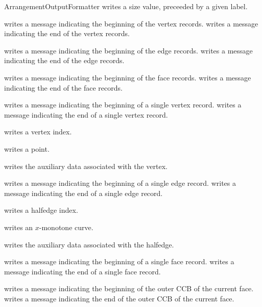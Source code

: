 \begin{ccRefConcept}{ArrangementOutputFormatter}
    {writes a size value, preceeded by a given label.}

    {writes a message indicating the beginning of the vertex records.}
\ccGlue
{}
    {writes a message indicating the end of the vertex records.}

    {writes a message indicating the beginning of the edge records.}
\ccGlue
{}
    {writes a message indicating the end of the edge records.}

    {writes a message indicating the beginning of the face records.}
\ccGlue
{}
    {writes a message indicating the end of the face records.}

    {writes a message indicating the beginning of a single vertex record.}
\ccGlue
{}
    {writes a message indicating the end of a single vertex record.}

    {writes a vertex index.}

    {writes a point.}

    {writes the auxiliary data associated with the vertex.}

    {writes a message indicating the beginning of a single edge record.}
\ccGlue
{}
    {writes a message indicating the end of a single edge record.}

    {writes a halfedge index.}

    {writes an $x$-monotone curve.}

    {writes the auxiliary data associated with the halfedge.}

    {writes a message indicating the beginning of a single face record.}
\ccGlue
{}
    {writes a message indicating the end of a single face record.}

    {writes a message indicating the beginning of the outer CCB of the current face.}
\ccGlue
{}
    {writes a message indicating the end of the outer CCB of the current face.}


\end{ccRefConcept}
